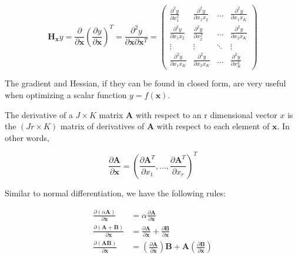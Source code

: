 \documentclass[11pt]{article}
\theoremstyle{definition}
\begin{document}
$$\mathbf{H}_{\mathbf{x}}y = \frac{\partial }{\partial \mathbf{x}} \left(\frac{\partial y}{\partial \mathbf{x}}\right)^T = \frac{\partial ^2y}{\partial \mathbf{x} \partial \mathbf{x}^T} = 
\begin{pmatrix}
    \frac{\partial ^2 y}{\partial x^2_1} & \frac{\partial ^2y}{\partial x_1 x_2} & \dots  & \frac{\partial ^2y}{\partial x_1 x_K} \\
    \frac{\partial ^2 y}{\partial x_1x_2} & \frac{\partial ^2y}{\partial x^2_2} & \dots  & \frac{\partial ^2y}{\partial x_2 x_K}\\
    \vdots & \vdots  & \ddots & \vdots \\
    \frac{\partial ^2y}{\partial x_1 x_K} & \frac{\partial ^2y}{\partial x_2 x_K} & \dots  & \frac{\partial ^2y}{\partial x^2_K}
\end{pmatrix}
$$

The gradient and Hessian, if they can be found in closed form, are very useful when optimizing a scalar function $y = f(\mathbf{x})$. 

The derivative of a $J \times K$ matrix $\mathbf{A}$ with respect to an r dimensional vector $x$ is the $(Jr \times K)$ matrix of derivatives of $\mathbf{A}$ with respect to each element of $\mathbf{x}$.  In other words,

\[\frac{\partial \mathbf{A}}{\partial \mathbf{x}} = \left(\frac{\partial \mathbf{A}^T}{\partial x_1}, \hdots, \frac{\partial \mathbf{A}^T}{\partial x_r}  \right)^T\]

Similar to normal differentiation, we have the following rules:

\begin{align*}
\frac{\partial (\alpha \mathbf{A})}{\partial \mathbf{x}} &= \alpha \frac{\partial \mathbf{A}}{\partial \mathbf{x}}\\
\frac{\partial (\mathbf{A+B})}{\partial \mathbf{x}} &=  \frac{\partial \mathbf{A}}{\partial \mathbf{x}} + \frac{\partial \mathbf{B}}{\partial \mathbf{x}}\\
\frac{\partial (\mathbf{AB})}{\partial \mathbf{x}} &=  \left(\frac{\partial \mathbf{A}}{\partial \mathbf{x}}\right)\mathbf{B} + \mathbf{A}\left(\frac{\partial \mathbf{B}}{\partial \mathbf{x}}\right)\\
\end{align*}
\end{document}
